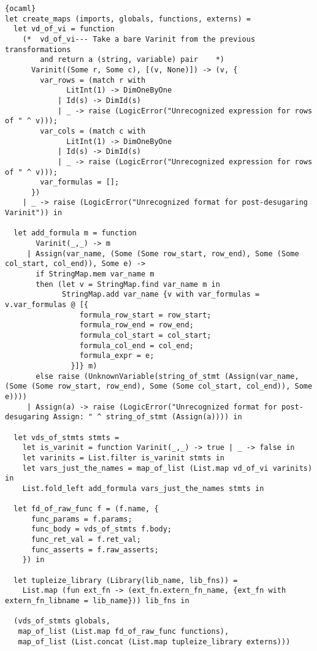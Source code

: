 \begin{lstlisting}{ocaml}
let create_maps (imports, globals, functions, externs) =
  let vd_of_vi = function
    (*  vd_of_vi--- Take a bare Varinit from the previous transformations
        and return a (string, variable) pair    *)
      Varinit((Some r, Some c), [(v, None)]) -> (v, {
        var_rows = (match r with
              LitInt(1) -> DimOneByOne
            | Id(s) -> DimId(s)
            | _ -> raise (LogicError("Unrecognized expression for rows of " ^ v)));
        var_cols = (match c with
              LitInt(1) -> DimOneByOne
            | Id(s) -> DimId(s)
            | _ -> raise (LogicError("Unrecognized expression for rows of " ^ v)));
        var_formulas = [];
      })
    | _ -> raise (LogicError("Unrecognized format for post-desugaring Varinit")) in

  let add_formula m = function
       Varinit(_,_) -> m
     | Assign(var_name, (Some (Some row_start, row_end), Some (Some col_start, col_end)), Some e) ->
       if StringMap.mem var_name m
       then (let v = StringMap.find var_name m in
             StringMap.add var_name {v with var_formulas = v.var_formulas @ [{
                 formula_row_start = row_start;
                 formula_row_end = row_end;
                 formula_col_start = col_start;
                 formula_col_end = col_end;
                 formula_expr = e;
               }]} m)
       else raise (UnknownVariable(string_of_stmt (Assign(var_name, (Some (Some row_start, row_end), Some (Some col_start, col_end)), Some e))))
     | Assign(a) -> raise (LogicError("Unrecognized format for post-desugaring Assign: " ^ string_of_stmt (Assign(a)))) in

  let vds_of_stmts stmts =
    let is_varinit = function Varinit(_,_) -> true | _ -> false in
    let varinits = List.filter is_varinit stmts in
    let vars_just_the_names = map_of_list (List.map vd_of_vi varinits) in
    List.fold_left add_formula vars_just_the_names stmts in

  let fd_of_raw_func f = (f.name, {
      func_params = f.params;
      func_body = vds_of_stmts f.body;
      func_ret_val = f.ret_val;
      func_asserts = f.raw_asserts;
    }) in

  let tupleize_library (Library(lib_name, lib_fns)) =
    List.map (fun ext_fn -> (ext_fn.extern_fn_name, {ext_fn with extern_fn_libname = lib_name})) lib_fns in

  (vds_of_stmts globals,
   map_of_list (List.map fd_of_raw_func functions),
   map_of_list (List.concat (List.map tupleize_library externs)))


\end{lstlisting}
